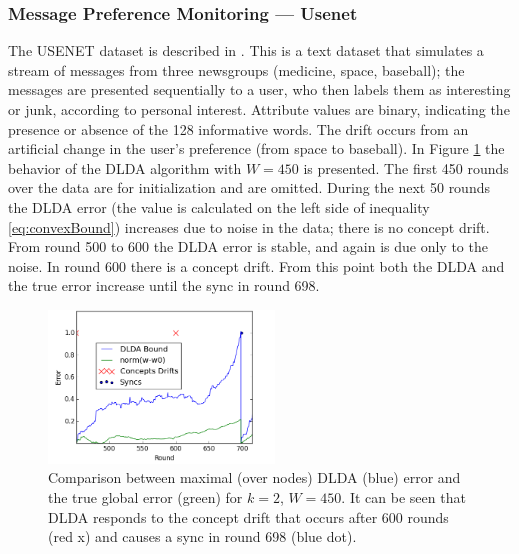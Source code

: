 \documentclass[11pt,twocolumn,varwidth=true,a4paper,fleqn]{article}
\begin{document}
\subsubsection{Message Preference Monitoring --- Usenet}
The USENET dataset is described in \cite{usenet}.
This is a text dataset that simulates a stream of messages from three newsgroups
(medicine, space, baseball); the messages are presented sequentially to a user, 
who then labels them as interesting or junk, according to personal interest. 
Attribute values are binary, indicating the presence or absence of the 128
informative words. The drift occurs from an artificial change in the user's
preference (from space to baseball). In Figure \ref{usenet} the behavior of the
DLDA algorithm with $W=450$ is presented. The first 450 rounds over the data are for
initialization and are omitted. During the next 50 rounds the DLDA error 
(the value is calculated on the left side of inequality
\ref{eq:convexBound}) increases due to noise in the data; there is
no concept drift. From round 500 to 600 the DLDA error is stable, 
and again is due only to the noise. In round 600 there is a concept 
drift.
From this point both the DLDA and the true error increase until the 
sync in round 698.

\begin{figure}[h]
	\centering
	\includegraphics[width=60mm]{Usenet/DriftDetected.png}
	\caption{Comparison between maximal (over nodes) DLDA (blue) 
	error and the true global error (green) for $k=2$, $W=450$. 
	It can be seen that DLDA responds to the concept drift that occurs 
	after 600 rounds (red x) and causes a sync in round 698 (blue dot).}
	\label{usenet}
	\end{figure}
	
\end{document}

